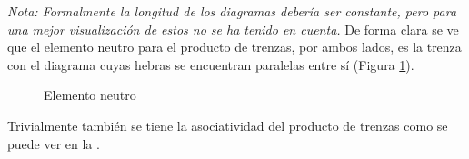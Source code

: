 \documentclass[12pt]{article}
\theoremstyle{definition}
\begin{document}
\textit{Nota: Formalmente la longitud de los diagramas debería ser constante, pero para una mejor visualización de estos no se ha tenido en cuenta.}
\newline
\newline
De forma clara se ve que el elemento neutro para el producto de trenzas, por ambos lados, es la trenza con el diagrama cuyas hebras se encuentran paralelas entre sí (Figura \ref{fig:elem_neu}).
\begin{comment}
hola
\end{comment}

\begin{figure}[h!]
\begin{center}
		\end{center}
		\caption{Elemento neutro}
		\label{fig:elem_neu}
\end{figure}


Trivialmente también se tiene la asociatividad del producto de trenzas como se puede ver en la .
\end{document}
